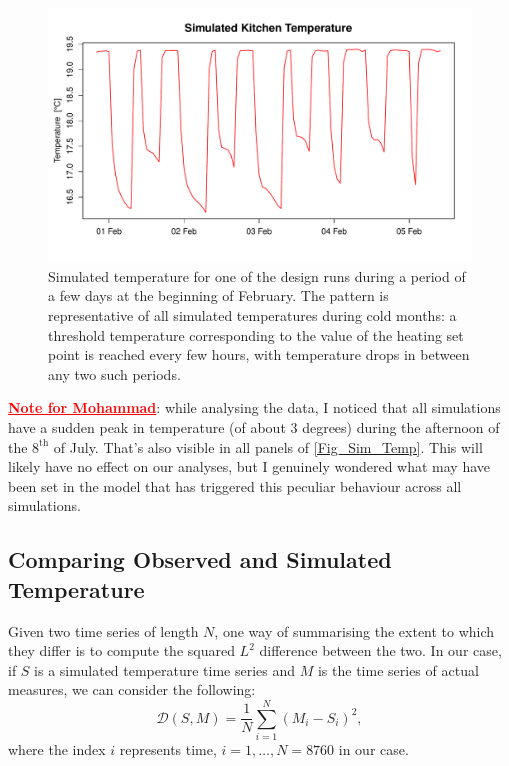 \documentclass[a4paper, 12pt]{article}
\newcommand{\D}{\mathcal{D}}
\begin{document}
\begin{figure}
\centering
\includegraphics[scale=0.63]{Temperatures/Zoom_570}
\caption{Simulated temperature for one of the design runs during a period of a few days at the beginning of February. The pattern is representative of all simulated temperatures during cold months: a threshold temperature corresponding to the value of the heating set point is reached every few hours, with temperature drops in between any two such periods.  }
\label{Fig_Zoom}
\end{figure}

\textcolor{red}{\bf \underline{Note for Mohammad}}: while analysing the data, I noticed that all simulations have a sudden peak in temperature (of about 3 degrees) during the afternoon of the $8^\text{th}$ of July. That's also visible in all panels of \autoref{Fig_Sim_Temp}. This will likely have no effect on our analyses, but I genuinely wondered what may have been set in the model that has triggered this peculiar behaviour across all simulations.


\subsection{Comparing Observed and Simulated Temperature}

Given two time series of length $N$, one way of summarising the extent to which they differ is to compute the squared $L^2$ difference between the two. In our case, if $S$ is a simulated temperature time series and $M$ is the time series of actual measures, we can consider the following:
\begin{equation}
\D(S,M) = \frac{1}{N} \sum_{i=1}^N {(M_i - S_i)}^2,
\end{equation}
where the index $i$ represents time, $i=1, \dots, N=8760$ in our case.
\end{document}
